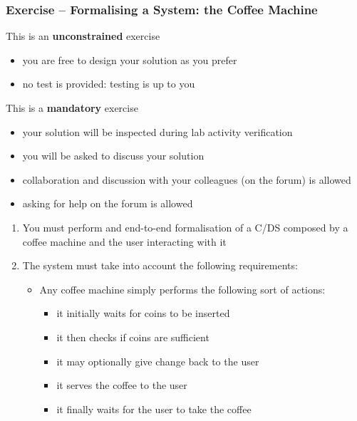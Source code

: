 \documentclass[presentation]{beamer}\mode<presentation>{\usetheme{AMSCesenaPurpleAndGold}}
\begin{document}
    \begin{frame}[allowframebreaks]
    \frametitle{Exercise \currentExercise{} -- Formalising a System: the Coffee Machine}

    \begin{alertblock}{This is an \textbf{unconstrained} exercise}
        \begin{itemize}
            \item you are free to design your solution as you prefer
            \item no test is provided: testing is up to you
        \end{itemize}
    \end{alertblock}

    \bigskip

    \begin{alertblock}{This is a \textbf{mandatory} exercise}
        \begin{itemize}
            \item your solution will be inspected during lab activity verification
            \item you will be asked to discuss your solution
            \item collaboration and discussion with your colleagues (on the forum) is allowed
            \item asking for help on the forum is allowed
        \end{itemize}
    \end{alertblock}

    \bigskip
    
    \begin{enumerate}
        \item You must perform and end-to-end formalisation of a C/DS composed by a coffee machine and the user interacting with it
        
        \bigskip

        \item The system must take into account the following requirements:
        \begin{itemize}

            \medskip
            
            \item Any coffee machine simply performs the following sort of actions:
            \begin{itemize}
                \item it initially \alert{waits} for \alert{coins} to be inserted
                \item it then \alert{checks} if coins are sufficient
                \item it may optionally give \alert{change} back to the user
                \item it serves the \alert{coffee} to the user
                \item it finally \alert{waits} for the \alert{user} to take the coffee 
            \end{itemize}


\end{itemize}
\end{enumerate}
\end{frame}
\end{document}
